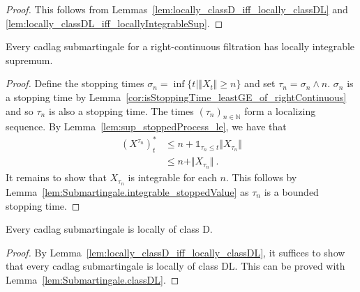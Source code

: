 \begin{proof}
  \leanok
This follows from Lemmas~\ref{lem:locally_classD_iff_locally_classDL} and \ref{lem:locally_classDL_iff_locallyIntegrableSup}.
\end{proof}


\begin{lemma}\label{lem:Submartingale.locallyIntegrableSup}
Every cadlag submartingale for a right-continuous filtration has locally integrable supremum.
\end{lemma}

\begin{proof}
Define the stopping times $\sigma_n = \inf\{t \mid \Vert X_t \Vert \ge n\}$ and set $\tau_n = \sigma_n \wedge n$.
$\sigma_n$ is a stopping time by Lemma~\ref{cor:isStoppingTime_leastGE_of_rightContinuous} and so $\tau_n$ is also a stopping time.
The times $(\tau_n)_{n \in \mathbb{N}}$ form a localizing sequence.
By Lemma~\ref{lem:sup_stoppedProcess_le}, we have that
\begin{align*}
  (X^{\tau_n})^*_t
  & \le n + \mathbb{1}_{\tau_n \le t} \Vert X_{\tau_n} \Vert \\
  & \le n + \Vert X_{\tau_n} \Vert
  \: .
\end{align*}
It remains to show that $X_{\tau_n}$ is integrable for each $n$.
This follows by Lemma~\ref{lem:Submartingale.integrable_stoppedValue} as $\tau_n$ is a bounded stopping time.
\end{proof}



\begin{lemma}\label{lem:Submartingale.locally_classD}
  \leanok
Every cadlag submartingale is locally of class D.
\end{lemma}

\begin{proof}
  \leanok
By Lemma~\ref{lem:locally_classD_iff_locally_classDL}, it suffices to show that every cadlag submartingale is locally of class DL.
This can be proved with Lemma~\ref{lem:Submartingale.classDL}.
\end{proof}


